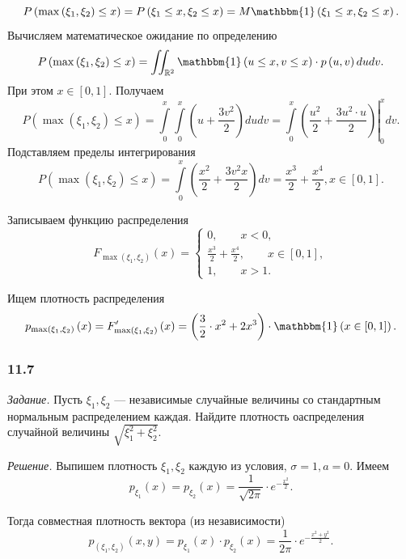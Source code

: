 \begin{enumerate}[label=\alph*)]
$$P \left( \max \left( \xi_1, \xi_2 \right) \leq x \right) =
P \left( \xi_1 \leq x, \xi_2 \leq x \right) =
M \mathbbm{1} \left( \xi_1 \leq x, \xi_2 \leq x \right).$$
Вычисляем математическое ожидание по определению
$$P \left( \max \left( \xi_1, \xi_2 \right) \leq x \right) =
\iint_{ \mathbb{R}^2} \mathbbm{1} \left( u \leq x, v \leq x \right) \cdot p \left( u, v \right) dudv.$$
При этом $x \in \left[ 0, 1 \right] $.
Получаем
$$P \left( \max \left( \xi_1, \xi_2 \right) \leq x \right) =
\int \limits_0^x \int \limits_0^x \left( u + \frac{3v^2}{2} \right) dudv =
\left. \int \limits_0^x \left( \frac{u^2}{2} + \frac{3u^2 \cdot u}{2} \right) \right|_0^x dv.$$
Подставляем пределы интегрирования
$$P \left( \max \left( \xi_1, \xi_2 \right) \leq x \right) =
\int \limits_0^x \left( \frac{x^2}{2} + \frac{3v^2 x}{2} \right) dv =
\frac{x^3}{2} + \frac{x^4}{2}, x \in \left[ 0, 1 \right].$$

Записываем функцию распределения
$$F_{ \max \left( \xi_1, \xi_2 \right) } \left( x \right) =
\begin{cases}
0, \qquad x < 0, \\
\frac{x^3}{2} + \frac{x^4}{2}, \qquad x \in \left[ 0, 1 \right], \\
1, \qquad x > 1.
\end{cases}$$

Ищем плотность распределения
$$p_{ \max \left( \xi_1, \xi_2 \right) } \left( x \right) =
F_{ \max \left( \xi_1, \xi_2 \right) }' \left( x \right) =
\left( \frac{3}{2} \cdot x^2 + 2x^3 \right) \cdot \mathbbm{1} \left( x \in \left[ 0, 1 \right] \right).$$
\end{enumerate}

\subsubsection*{11.7}

\textit{Задание.} Пусть $ \xi_1, \xi_2$ --- независимые случайные величины со стандартным нормальным распределением каждая.
Найдите плотность оаспределения случайной величины $ \sqrt{ \xi_1^2 + \xi_2^2}$.

\textit{Решение.} Выпишем плотность $ \xi_1, \xi_2$ каждую из условия, $ \sigma = 1, a = 0$.
Имеем
$$p_{ \xi_1} \left( x \right) =
p_{ \xi_2} \left( x \right) =
\frac{1}{ \sqrt{2 \pi }} \cdot e^{- \frac{x^2}{2}}.$$

Тогда совместная плотность вектора (из независимости)
$$p_{ \left( \xi_1, \xi_2 \right) } \left( x, y \right) =
p_{ \xi_1} \left( x \right) \cdot p_{ \xi_2} \left( x \right) =
\frac{1}{2 \pi } \cdot e^{- \frac{x^2 + y^2}{2}}.$$


